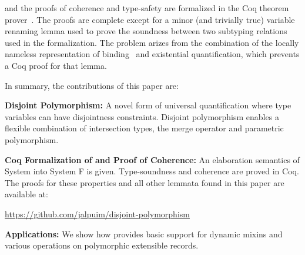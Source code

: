 \name and the proofs of coherence and type-safety are formalized in
the Coq theorem prover~\cite{coq}. The proofs are complete except for a minor
(and trivially true) variable renaming lemma used to prove the
soundness between two subtyping relations used in the
formalization. The problem arizes from the combination of the locally
nameless representation of binding~\cite{aydemir-popl-08} and existential
quantification, which prevents a Coq proof for that lemma.

In summary, the contributions of this paper are:

\begin{itemize*}

\item {\bf Disjoint Polymorphism:} A novel form of universal
quantification where type variables can have disjointness
constraints. Disjoint polymorphism enables a flexible combination
of intersection types, the merge operator and parametric
polymorphism. 

\item {\bf Coq Formalization of \name and Proof of Coherence:} An
  elaboration semantics of System \name into System F is
  given. Type-soundness and coherence are proved in Coq.
  The proofs for these properties and all other lemmata found in this paper
  are available at: 

  {\small \url{https://github.com/jalpuim/disjoint-polymorphism}}

\item {\bf Applications:} We show how \name provides basic support
 for dynamic mixins and various operations on polymorphic extensible records.

\end{itemize*}

